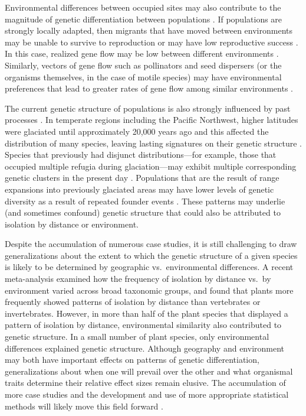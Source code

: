 \documentclass{article}
\begin{document}
Environmental differences between occupied sites may also contribute to the magnitude of genetic differentiation between populations \citep{slatkin1973gene,wang2014isolation}. If populations are strongly locally adapted, then migrants that have moved between environments may be unable to survive to reproduction or may have low reproductive success \citep{nosil2005perspective}. In this case, realized gene flow may be low between different environments \citep{mosca2012geographical}. Similarly, vectors of gene flow such as pollinators and seed dispersers (or the organisms themselves, in the case of motile species) may have environmental preferences that lead to greater rates of gene flow among similar environments \citep{bolnick2009phenotype}.

The current genetic structure of populations is also strongly influenced by past processes \citep{hewitt2004genetic}. In temperate regions including the Pacific Northwest, higher latitudes were glaciated until approximately 20,000 years ago \citep{booth2003cordilleran} and this affected the distribution of many species, leaving lasting signatures on their genetic structure \citep{brunsfeld2001comparative, shafer2010glaciers}. Species that previously had disjunct distributions---for example, those that occupied multiple refugia during glaciation---may exhibit multiple corresponding genetic clusters in the present day \citep{beatty2011phylogeographic,carstens2013model, sproul2015climate}. Populations that are the result of range expansions into previously glaciated areas may have lower levels of genetic diversity as a result of repeated founder events \citep{kuchta2005isolation, hewitt2004genetic}. These patterns may underlie (and sometimes confound) genetic structure that could also be attributed to isolation by distance or environment.

Despite the accumulation of numerous case studies, it is still challenging to draw generalizations about the extent to which the genetic structure of a given species is likely to be determined by geographic vs.\ environmental differences. A recent meta-analysis \citep{sexton2014genetic} examined how the frequency of isolation by distance vs.\ by environment varied across broad taxonomic groups, and found that plants more frequently showed patterns of isolation by distance than vertebrates or invertebrates. However, in more than half of the plant species that displayed a pattern of isolation by distance, environmental similarity also contributed to genetic structure. In a small number of plant species, only environmental differences explained genetic structure. Although geography and environment may both have important effects on patterns of genetic differentiation, generalizations about when one will prevail over the other and what organismal traits determine their relative effect sizes remain elusive. The accumulation of more case studies and the development and use of more appropriate statistical methods will likely move this field forward \citep{wang2014isolation, bradburd2013disentangling}.
\end{document}
